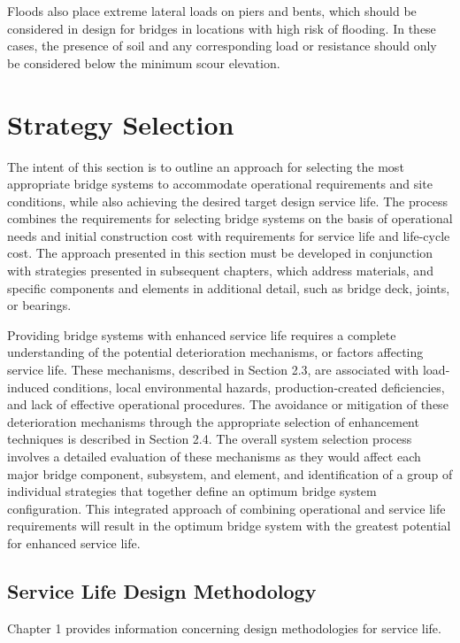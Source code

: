 Floods also place extreme lateral loads on piers and bents, which should be considered in design for bridges in
locations with high risk of flooding. In these cases, the presence of soil and any corresponding load or resistance
should only be considered below the minimum scour elevation.

\section{Strategy Selection}
\label{sec:strategy-selection}

The intent of this section is to outline an approach for selecting the most appropriate bridge systems to
accommodate operational requirements and site conditions, while also achieving the desired target design service
life. The process combines the requirements for selecting bridge systems on the basis of operational needs and initial
construction cost with requirements for service life and life-cycle cost. The approach presented in this section must
be developed in conjunction with strategies presented in subsequent chapters, which address materials, and specific
components and elements in additional detail, such as bridge deck, joints, or bearings.

Providing bridge systems with enhanced service life requires a complete understanding of the potential
deterioration mechanisms, or factors affecting service life. These mechanisms, described in Section 2.3, are
associated with load-induced conditions, local environmental hazards, production-created deficiencies, and lack of
effective operational procedures. The avoidance or mitigation of these deterioration mechanisms through the
appropriate selection of enhancement techniques is described in Section 2.4. The overall system selection process
involves a detailed evaluation of these mechanisms as they would affect each major bridge component, subsystem,
and element, and identification of a group of individual strategies that together define an optimum bridge system configuration. This integrated approach of combining operational and service life requirements will result in the
optimum bridge system with the greatest potential for enhanced service life.

\subsection{Service Life Design Methodology}

Chapter 1 provides information concerning design methodologies for service life.


